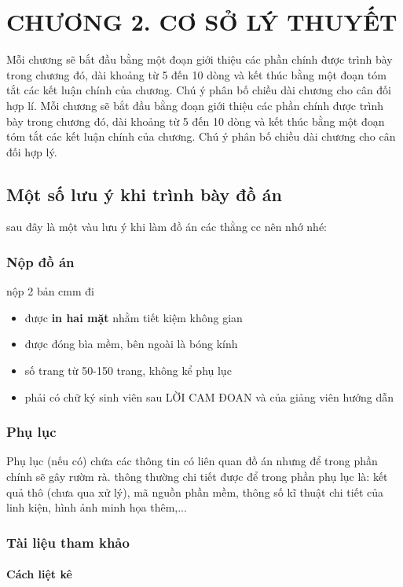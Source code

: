 \documentclass{article}
\begin{document}
\newpage
\section*{CHƯƠNG 2. CƠ SỞ LÝ THUYẾT}
\setcounter{section}{2}
Mỗi chương sẽ bắt đầu bằng một đoạn giới thiệu các phần chính được trình bày trong chương đó, dài khoảng từ 5 đến 10 dòng và kết thúc bằng một đoạn tóm tắt các kết luận chính của chương. Chú ý phân bố chiều dài chương cho cân đối hợp lí.
Mỗi chương sẽ bắt đầu bằng đoạn giới thiệu các phần chính được trình bày trong chương đó, dài khoảng từ 5 đến 10 dòng và kết thúc bằng một đoạn tóm tắt các kết luận chính của chương. Chú ý phân bố chiều dài chương cho cân đối hợp lý.\cite{nani2021antioxidant}
\subsection{Một số lưu ý khi trình bày đồ án}
sau đây là một vàu lưu ý khi làm đồ án các thằng cc nên nhớ nhé:
\subsubsection{Nộp đồ án}
nộp 2 bản cmm đi
\begin{itemize}
    \item được \textbf{in hai mặt} nhằm tiết kiệm không gian
    \item được đóng bìa mềm, bên ngoài là bóng kính
    \item số trang từ 50-150 trang, không kể phụ lục
    \item phải có chữ ký sinh viên sau LỜI CAM ĐOAN và của giảng viên hướng dẫn
\end{itemize}
\subsubsection{Phụ lục}
Phụ lục (nếu có) chứa các thông tin có liên quan đồ án nhưng để trong phần chính sẽ gây rườm rà. thông thường chi tiết được để trong phần phụ lục là: kết quả thô (chưa qua xử lý), mã nguồn phần mềm, thông số kĩ thuật chi tiết của linh kiện, hình ảnh minh họa thêm,...

\subsubsection{Tài liệu tham khảo}
\paragraph{Cách liệt kê} \mbox{}
\end{document}

